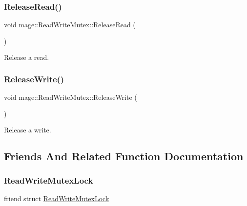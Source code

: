 \subsubsection{\texorpdfstring{Release\+Read()}{ReleaseRead()}}
{\footnotesize\ttfamily void mage\+::\+Read\+Write\+Mutex\+::\+Release\+Read (\begin{DoxyParamCaption}{ }\end{DoxyParamCaption})\hspace{0.3cm}{\ttfamily [private]}}

Release a read. \hypertarget{classmage_1_1_read_write_mutex_ad0fd296bdaa212f54a58372c8dfe1d1d}{}\label{classmage_1_1_read_write_mutex_ad0fd296bdaa212f54a58372c8dfe1d1d} 
\subsubsection{\texorpdfstring{Release\+Write()}{ReleaseWrite()}}
{\footnotesize\ttfamily void mage\+::\+Read\+Write\+Mutex\+::\+Release\+Write (\begin{DoxyParamCaption}{ }\end{DoxyParamCaption})\hspace{0.3cm}{\ttfamily [private]}}

Release a write. 

\subsection{Friends And Related Function Documentation}
\hypertarget{classmage_1_1_read_write_mutex_a7ae207fc659160d3c55a5ba1468007f7}{}\label{classmage_1_1_read_write_mutex_a7ae207fc659160d3c55a5ba1468007f7} 
\subsubsection{\texorpdfstring{Read\+Write\+Mutex\+Lock}{ReadWriteMutexLock}}
{\footnotesize\ttfamily friend struct \hyperlink{structmage_1_1_read_write_mutex_lock}{Read\+Write\+Mutex\+Lock}\hspace{0.3cm}{\ttfamily [friend]}}



